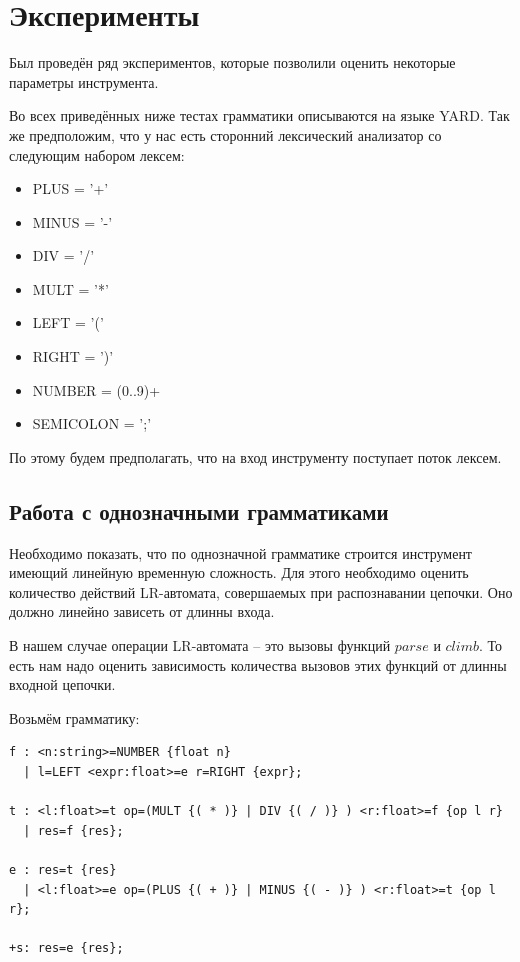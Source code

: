 \section{Эксперименты}

Был проведён ряд экспериментов, которые позволили оценить некоторые параметры инструмента.

Во всех приведённых ниже тестах грамматики описываются на языке YARD. Так же предположим, что у нас есть сторонний лексический анализатор со следующим набором лексем:
\begin{itemize}
  \item PLUS = '+'
  \item MINUS = '-'
  \item DIV = '/'
  \item MULT = '*'
  \item LEFT = '('
  \item RIGHT = ')'
  \item NUMBER = (0..9)+
  \item SEMICOLON = ';'
\end{itemize}

По этому будем предполагать, что на вход инструменту поступает поток лексем.


\subsection{Работа с однозначными грамматиками} 

Необходимо показать, что по однозначной грамматике строится инструмент имеющий линейную временную сложность. Для этого необходимо оценить количество действий LR-автомата, совершаемых при распознавании цепочки. Оно должно линейно зависеть от длинны входа.

В нашем случае операции LR-автомата -- это вызовы функций $parse$ и $climb$. То есть нам надо оценить зависимость количества вызовов этих функций от длинны входной цепочки.


Возьмём грамматику:

\begin{verbatim}
f : <n:string>=NUMBER {float n}
  | l=LEFT <expr:float>=e r=RIGHT {expr};  
  
t : <l:float>=t op=(MULT {( * )} | DIV {( / )} ) <r:float>=f {op l r}
  | res=f {res};
  
e : res=t {res}
  | <l:float>=e op=(PLUS {( + )} | MINUS {( - )} ) <r:float>=t {op l r}; 
  
+s: res=e {res};
\end{verbatim}

